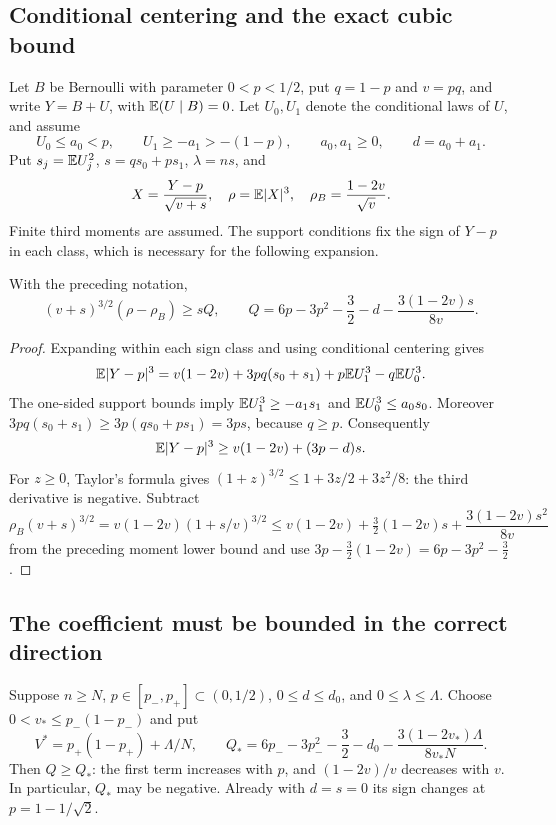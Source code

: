 \subsection{Conditional centering and the exact cubic bound}
Let $B$ be Bernoulli with parameter $0<p<1/2$, put $q=1-p$ and $v=pq$,
and write $Y=B+U$, with $\mathbb E(U\mid B)=0$.
Let $U_0,U_1$ denote the conditional laws of $U$, and assume
\[
 U_0\le a_0<p,\qquad U_1\ge-a_1>-(1-p),\qquad
 a_0,a_1\ge0,\qquad d=a_0+a_1.
\]
Put $s_j=\mathbb E U_j^2$, $s=qs_0+ps_1$, $\lambda=ns$, and
\[
 X=\frac{Y-p}{\sqrt{v+s}},\quad
 \rho=\mathbb E|X|^3,\quad
 \rho_B=\frac{1-2v}{\sqrt v}.
\]
Finite third moments are assumed. The support conditions fix the sign of
$Y-p$ in each class, which is necessary for the following expansion.

\begin{lemma}\label{ms:local42:cubic}
With the preceding notation,
\begin{equation}\label{ms:local42:bracket}
 (v+s)^{3/2}(\rho-\rho_B)\ge sQ,\qquad
 Q=6p-3p^2-\frac32-d-\frac{3(1-2v)s}{8v}.
\end{equation}
\end{lemma}
\begin{proof}
Expanding within each sign class and using conditional centering gives
\[
 \mathbb E|Y-p|^3=v(1-2v)+3pq(s_0+s_1)
                         +p\mathbb E U_1^3-q\mathbb E U_0^3.
\]
The one-sided support bounds imply
$\mathbb E U_1^3\ge-a_1s_1$ and $\mathbb E U_0^3\le a_0s_0$.
Moreover $3pq(s_0+s_1)\ge3p(qs_0+ps_1)=3ps$, because $q\ge p$.
Consequently
\[
                         \mathbb E|Y-p|^3\ge v(1-2v)+(3p-d)s.
\]
For $z\ge0$, Taylor's formula gives
$(1+z)^{3/2}\le1+3z/2+3z^2/8$: the third derivative is negative.
Subtract
\[
 \rho_B(v+s)^{3/2}
 =v(1-2v)(1+s/v)^{3/2}
 \le v(1-2v)+\tfrac32(1-2v)s+\frac{3(1-2v)s^2}{8v}
\]
from the preceding moment lower bound and use
$3p-\tfrac32(1-2v)=6p-3p^2-\tfrac32$.
\end{proof}

\subsection{The coefficient must be bounded in the correct direction}
Suppose $n\ge N$, $p\in[p_-,p_+]\subset(0,1/2)$,
$0\le d\le d_0$, and $0\le\lambda\le\Lambda$.
Choose $0<v_*\le p_-(1-p_-)$ and put
\[
 V^*=p_+(1-p_+)+\Lambda/N,\qquad
 Q_*=6p_--3p_-^2-\frac32-d_0
                     -\frac{3(1-2v_*)\Lambda}{8v_*N}.
\]
Then $Q\ge Q_*$: the first term increases with $p$, and
$(1-2v)/v$ decreases with $v$. In particular, $Q_*$ may be negative.
Already with $d=s=0$ its sign changes at $p=1-1/\sqrt2$.

